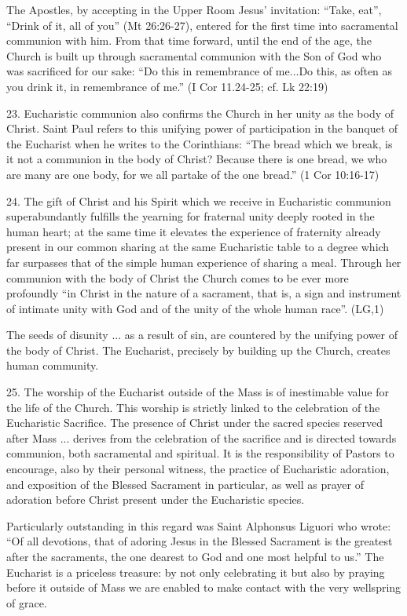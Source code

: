 \documentclass[oneside]{book}
\begin{document}
The Apostles, by accepting in the Upper Room Jesus' invitation: ``Take, eat'',
``Drink of it, all of you'' (Mt 26:26-27), entered for the first time into
sacramental communion with him. From that time forward, until the end of the
age, the Church is built up through sacramental communion with the Son of God
who was sacrificed for our sake: ``Do this in remembrance of me...Do this, as
often as you drink it, in remembrance of me.'' (I Cor 11.24-25; cf. Lk 22:19)

23. Eucharistic communion also confirms the Church in her unity as the body of
Christ. Saint Paul refers to this unifying power of participation in the banquet
of the Eucharist when he writes to the Corinthians: ``The bread which we break,
is it not a communion in the body of Christ? Because there is one bread, we who
are many are one body, for we all partake of the one bread.'' (1 Cor 10:16-17)

24. The gift of Christ and his Spirit which we receive in Eucharistic communion
superabundantly fulfills the yearning for fraternal unity deeply rooted in the
human heart; at the same time it elevates the experience of fraternity already
present in our common sharing at the same Eucharistic table to a degree which
far surpasses that of the simple human experience of sharing a meal. Through her
communion with the body of Christ the Church comes to be ever more profoundly
``in Christ in the nature of a sacrament, that is, a sign and instrument of
intimate unity with God and of the unity of the whole human race''. (LG,1)

The seeds of disunity ... as a result of sin, are countered by the unifying
power of the body of Christ. The Eucharist, precisely by building up the Church,
creates human community.

25. The worship of the Eucharist outside of the Mass is of inestimable value for
the life of the Church. This worship is strictly linked to the celebration of
the Eucharistic Sacrifice. The presence of Christ under the sacred species
reserved after Mass ... derives from the celebration of the sacrifice and is
directed towards communion, both sacramental and spiritual. It is the
responsibility of Pastors to encourage, also by their personal witness, the
practice of Eucharistic adoration, and exposition of the Blessed Sacrament in
particular, as well as prayer of adoration before Christ present under the
Eucharistic species.

Particularly outstanding in this regard was Saint Alphonsus Liguori who wrote:
``Of all devotions, that of adoring Jesus in the Blessed Sacrament is the
greatest after the sacraments, the one dearest to God and one most helpful to
us.''  The Eucharist is a priceless treasure: by not only celebrating it but
also by praying before it outside of Mass we are enabled to make contact with
the very wellspring of grace.
\end{document}
